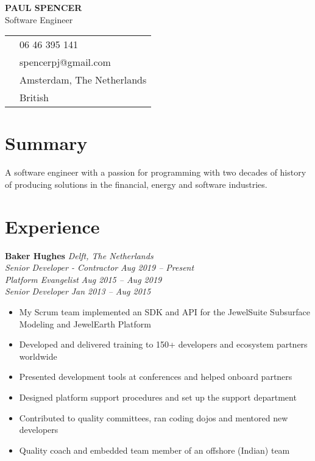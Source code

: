 \documentclass[11pt,a4paper]{article}
\newcommand{\contactItem}[2]{
    {\color{secondary}\small#1} & #2 \\
}
\begin{document}
\begin{center}
    {\Huge\textbf{PAUL SPENCER}}\\[0.5em]
    {\color{secondary}\large Software Engineer}\\[1em]
\end{center}

\begin{tabular}{ll}
    \contactItem{\faPhone}{06 46 395 141}
    \contactItem{\faEnvelope}{spencerpj@gmail.com}
    \contactItem{\faMapMarker}{Amsterdam, The Netherlands}
    \contactItem{\faFlag}{British}
\end{tabular}

\section{Summary}
A software engineer with a passion for programming with two decades of history of producing solutions in the financial, energy and software industries.

\section{Experience}
\textbf{Baker Hughes} \hfill \textit{Delft, The Netherlands}\\
\textit{Senior Developer - Contractor} \hfill \textit{Aug 2019 -- Present}\\
\textit{Platform Evangelist} \hfill \textit{Aug 2015 -- Aug 2019}\\
\textit{Senior Developer} \hfill \textit{Jan 2013 -- Aug 2015}
\begin{itemize}[leftmargin=*]
    \item My Scrum team implemented an SDK and API for the JewelSuite Subsurface Modeling and JewelEarth Platform
    \item Developed and delivered training to 150+ developers and ecosystem partners worldwide
    \item Presented development tools at conferences and helped onboard partners
    \item Designed platform support procedures and set up the support department
    \item Contributed to quality committees, ran coding dojos and mentored new developers
    \item Quality coach and embedded team member of an offshore (Indian) team
\end{itemize}
\end{document}
